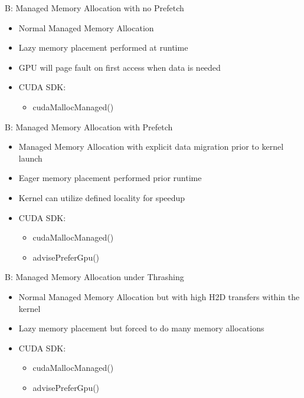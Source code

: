 \documentclass{beamer}
\begin{document}
\begin{frame}{B: Managed Memory Allocation with no Prefetch}
\begin{itemize}
    \item Normal Managed Memory Allocation 
    \item Lazy memory placement performed at runtime
    \item GPU will page fault on first access when data is needed
    \item CUDA SDK:
        \begin{itemize}
            \item cudaMallocManaged()
        \end{itemize}
\end{itemize}
\end{frame}

\begin{frame}{B: Managed Memory Allocation with Prefetch}
\begin{itemize}
    \item Managed Memory Allocation with explicit data migration prior to kernel launch  
    \item Eager memory placement performed prior runtime
    \item Kernel can utilize defined locality for speedup
    \item CUDA SDK:
        \begin{itemize}
            \item cudaMallocManaged()
            \item advisePreferGpu()
        \end{itemize}
\end{itemize}
\end{frame}

\begin{frame}{B: Managed Memory Allocation under Thrashing}
\begin{itemize}
    \item Normal Managed Memory Allocation but with high H2D transfers within the kernel
    \item Lazy memory placement but forced to do many memory allocations 
    \item CUDA SDK:
        \begin{itemize}
            \item cudaMallocManaged()
            \item advisePreferGpu()
        \end{itemize}
\end{itemize}
\end{frame}
\end{document}
